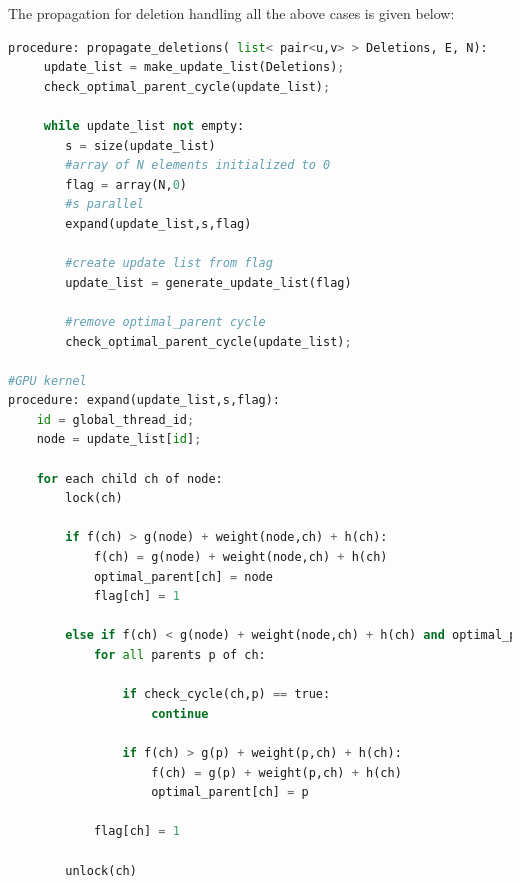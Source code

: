 \documentclass[a4paper]{article}
\begin{document}

The propagation for deletion handling all the above cases is given below:
\begin{lstlisting}[language=python, caption=Propagation of Deletions]
procedure: propagate_deletions( list< pair<u,v> > Deletions, E, N):
     update_list = make_update_list(Deletions);
     check_optimal_parent_cycle(update_list);
     
     while update_list not empty:
        s = size(update_list)
        #array of N elements initialized to 0
        flag = array(N,0)
        #s parallel
        expand(update_list,s,flag)
        
        #create update list from flag
        update_list = generate_update_list(flag)
        
        #remove optimal_parent cycle 
        check_optimal_parent_cycle(update_list);

#GPU kernel
procedure: expand(update_list,s,flag):
    id = global_thread_id;
    node = update_list[id];
    
    for each child ch of node:
        lock(ch)
        
        if f(ch) > g(node) + weight(node,ch) + h(ch):
            f(ch) = g(node) + weight(node,ch) + h(ch)  
            optimal_parent[ch] = node
            flag[ch] = 1
        
        else if f(ch) < g(node) + weight(node,ch) + h(ch) and optimal_parent[ch] == node:
            for all parents p of ch:
            
                if check_cycle(ch,p) == true:
                    continue
            
                if f(ch) > g(p) + weight(p,ch) + h(ch):
                    f(ch) = g(p) + weight(p,ch) + h(ch)
                    optimal_parent[ch] = p
            
            flag[ch] = 1
        
        unlock(ch)
        
\end{lstlisting}
\end{document}
